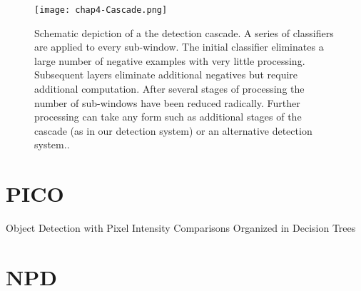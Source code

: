 \begin{compactitem}
\begin{figure}[h]
  \centering
	\texttt{[image: chap4-Cascade.png]}
  \caption{Schematic depiction of a the detection cascade. A series of classifiers are applied
to every sub-window. The initial classifier eliminates a large number of negative
examples with very little processing. Subsequent layers eliminate additional negatives
but require additional computation. After several stages of processing the number of
sub-windows have been reduced radically. Further processing can take any form such
as additional stages of the cascade (as in our detection system) or an alternative detection
system..}
  \label{fig:chap4-Cascade}
\end{figure}

\end{compactitem}

\section{PICO}
Object Detection with Pixel Intensity Comparisons Organized in Decision Trees
\cite{DBLPjournalscorrabs}

\section{NPD}


